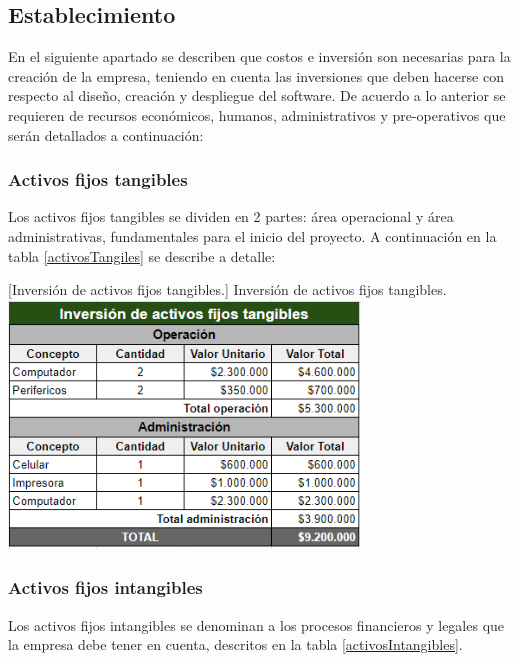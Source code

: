 \subsection{Establecimiento}

En el siguiente apartado se describen que costos e inversión son necesarias para la creación de la empresa, teniendo en cuenta las inversiones que deben hacerse con respecto al diseño, creación y despliegue del software. De acuerdo a lo anterior se requieren de recursos económicos, humanos, administrativos y pre-operativos que serán detallados a continuación:

\subsubsection{Activos fijos tangibles}

Los activos fijos tangibles se dividen en 2 partes: área operacional y área administrativas, fundamentales para el inicio del proyecto. A continuación en la  tabla \ref{activosTangiles} se describe a detalle:

\vspace{2mm}
\begin{minipage}{0.9\textwidth}
\centering
{}[{Inversión de activos fijos tangibles.}]{ Inversión de activos fijos tangibles. }
\label{activosTangiles}
\includegraphics[width=0.7\textwidth]{Images/fijosTangibles.png}
\end{minipage}

\subsubsection{Activos fijos intangibles}

Los activos fijos intangibles se denominan a los procesos financieros y legales que la empresa debe tener en cuenta, descritos en la tabla \ref{activosIntangibles}.

